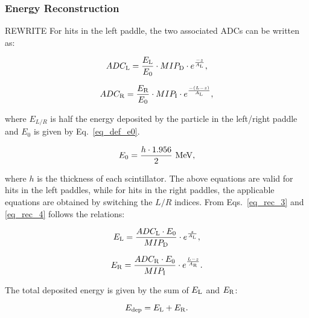\subsubsection{Energy Reconstruction}
{\color{red} REWRITE 
For hits in the left paddle, the two associated ADCs can be written as:

\begin{equation}
\label{eq_rec_3}
ADC_{\rm{L}}=\frac{E_{\rm{L}}}{E_0}\cdot MIP_{\rm{D}}\cdot e^{\frac{-z}{A_{\rm{L}}}},
\end{equation}

\begin{equation}
\label{eq_rec_4}
ADC_{\rm{R}}=\frac{E_{\rm{R}}}{E_0}\cdot MIP_{\rm{I}}\cdot e^{\frac{-(L-z)}{A_{\rm{L}}}},
\end{equation}

\noindent
where $E_{L/R}$ is half the energy deposited by the particle in the left/right paddle and $E_0$ is given by
Eq.~\ref{eq_def_e0}.

\begin{equation}\label{eq_def_e0}
E_0=\frac{h\cdot 1.956}{2}~\rm{MeV},
\end{equation}

\noindent
where $h$ is the thickness of each scintillator. The above equations are valid for hits in the left paddles, while
for hits in the right paddles, the applicable equations are obtained by switching the $L/R$ indices. From
Eqs.~\ref{eq_rec_3} and \ref{eq_rec_4} follows the relations:

\begin{equation}
E_{\rm{L}}=\frac{ADC_{\rm{L}} \cdot E_0}{MIP_{\rm{D}}}\cdot e^{\frac{z}{A_{\rm{L}}}},
\end{equation}

\begin{equation}
E_{\rm{R}}=\frac{ADC_{\rm{R}} \cdot E_0}{MIP_{\rm{I}}}\cdot e^{\frac{L-z}{A_{\rm{R}}}}.
\end{equation}

\noindent
The total deposited energy is given by the sum of $E_{\rm{L}}$ and $E_{\rm{R}}$:

\begin{equation}
E_{\rm{dep}}=E_{\rm{L}}+E_{\rm{R}}.
\end{equation}

}

